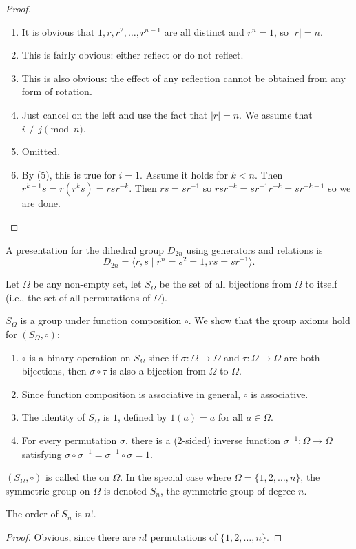 \begin{example}
\begin{proof} \
\begin{enumerate}[label=(\arabic*)]
\item It is obvious that $1,r,r^2,\dots,r^{n-1}$ are all distinct and $r^n=1$, so $|r|=n$.
\item This is fairly obvious: either reflect or do not reflect.
\item This is also obvious: the effect of any reflection cannot be obtained from any form of rotation.
\item Just cancel on the left and use the fact that $|r|=n$. We assume that $i\not\equiv j\pmod n$.
\item Omitted.
\item By (5), this is true for $i=1$. Assume it holds for $k<n$. Then $r^{k+1}s=r(r^ks)=rsr^{-k}$. Then $rs=sr^{-1}$ so $rsr^{-k}=sr^{-1}r^{-k}=sr^{-k-1}$ so we are done.
\end{enumerate}
\end{proof}

A presentation for the dihedral group $D_{2n}$ using generators and relations is
\[D_{2n}=\langle r,s\mid r^n=s^2=1,rs=sr^{-1}\rangle.\]
\end{example}

\begin{example}
Let $\Omega$ be any non-empty set, let $S_\Omega$ be the set of all bijections from $\Omega$ to itself (i.e., the set of all permutations of $\Omega$).

$S_\Omega$ is a group under function composition $\circ$. We show that the group axioms hold for $(S_\Omega,\circ)$:
\begin{enumerate}[label=(\roman*)]
\item $\circ$ is a binary operation on $S_\Omega$ since if $\sigma:\Omega\to\Omega$ and $\tau:\Omega\to\Omega$ are both bijections, then $\sigma\circ\tau$ is also a bijection from $\Omega$ to $\Omega$.
\item Since function composition is associative in general, $\circ$ is associative.
\item The identity of $S_\Omega$ is $1$, defined by $1(a)=a$ for all $a\in\Omega$.
\item For every permutation $\sigma$, there is a (2-sided) inverse function $\sigma^{-1}:\Omega\to\Omega$ satisfying $\sigma\circ\sigma^{-1}=\sigma^{-1}\circ\sigma=1$.
\end{enumerate}

$(S_\Omega,\circ)$ is called the  on $\Omega$. In the special case where $\Omega=\{1,2,\dots,n\}$, the symmetric group on $\Omega$ is denoted $S_n$, the symmetric group of degree $n$.

\begin{proposition}
The order of $S_n$ is $n!$.
\end{proposition}

\begin{proof}
Obvious, since there are $n!$ permutations of $\{1,2,\dots,n\}$.
\end{proof}
\end{example}

